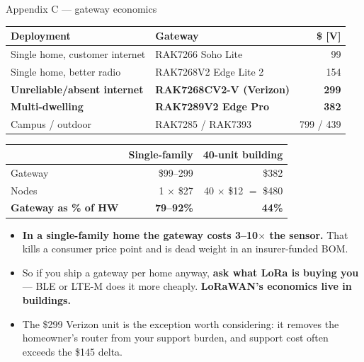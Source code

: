 \documentclass[aspectratio=169,t,10pt,xcolor={table,svgnames}]{beamer}
\newcommand{\hd}[1]{\textbf{\footnotesize #1}}
\begin{document}
\begin{frame}{Appendix C --- gateway economics}
  \scriptsize
  \begin{tabular}{@{}p{}p{}r@{}}
    \toprule
    \hd{Deployment} & \hd{Gateway} & \hd{\$ [V]} \\
    \midrule
    Single home, customer internet      & RAK7266 Soho Lite      & 99 \\
    Single home, better radio           & RAK7268V2 Edge Lite 2  & 154 \\
    \textbf{Unreliable/absent internet} & \textbf{RAK7268CV2-V (Verizon)} & \textbf{299} \\
    \textbf{Multi-dwelling}             & \textbf{RAK7289V2 Edge Pro}     & \textbf{382} \\
    Campus / outdoor                    & RAK7285 / RAK7393      & 799 / 439 \\
    \bottomrule
  \end{tabular}
  \vspace{0.7em}
  \begin{tabular}{@{}p{}rr@{}}
    \toprule
    & \hd{Single-family} & \hd{40-unit building} \\
    \midrule
    Gateway                        & \$99--299 & \$382 \\
    Nodes                          & 1 $\times$ \$27 & 40 $\times$ \$12 $=$ \$480 \\
    \textbf{Gateway as \% of HW}   & \cellcolor{fill2}\textbf{79--92\%} & \cellcolor{fill1}\textbf{44\%} \\
    \bottomrule
  \end{tabular}
  \vspace{0.6em}
  \begin{itemize}\scriptsize
    \item \textbf{In a single-family home the gateway costs 3--10$\times$ the sensor.} That kills a
          consumer price point and is dead weight in an insurer-funded BOM.
    \item So if you ship a gateway per home anyway, \textbf{ask what LoRa is buying you} --- BLE or
          LTE-M does it more cheaply. \textbf{LoRaWAN's economics live in buildings.}
    \item The \$299 Verizon unit is the exception worth considering: it removes the homeowner's
          router from your support burden, and support cost often exceeds the \$145 delta.
  \end{itemize}
\end{frame}
\end{document}
